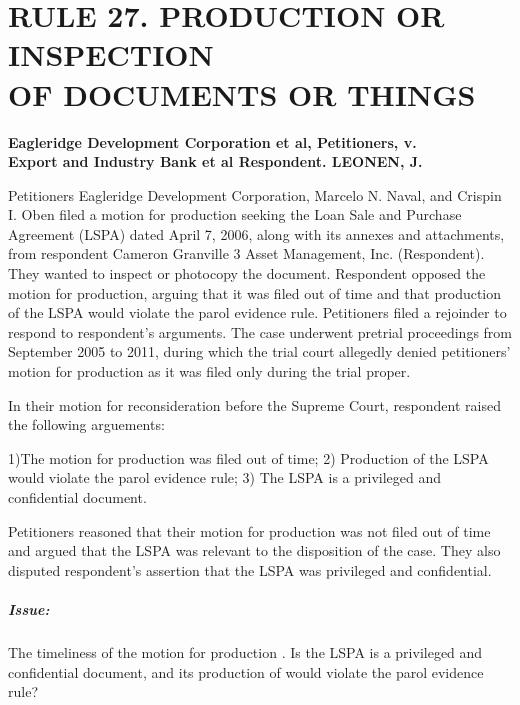 \documentclass[
12pt,
oneside,
onehalfspacing,
headsepline
]{DigestCollection}
\begin{document}
\chapter{RULE 27. PRODUCTION OR INSPECTION\\ OF DOCUMENTS OR THINGS}
\label{3e5096e0-0a13-11ef-932c-63c852f65e48}


\label{34346c20-0a10-11ef-932c-63c852f65e48}


\noindent\textbf{Eagleridge Development Corporation et al, Petitioners, v. \\Export and Industry Bank et al Respondent. LEONEN, J.}\vspace{0.4cm}

Petitioners Eagleridge Development Corporation, Marcelo N. Naval, and Crispin I. Oben filed a motion for production seeking the Loan Sale and Purchase Agreement (LSPA) dated April 7, 2006, along with its annexes and attachments, from respondent Cameron Granville 3 Asset Management, Inc. (Respondent). They wanted to inspect or photocopy the document. Respondent opposed the motion for production, arguing that it was filed out of time and that production of the LSPA would violate the parol evidence rule. Petitioners filed a rejoinder to respond to respondent's arguments. The case underwent pretrial proceedings from September 2005 to 2011, during which the trial court allegedly denied petitioners' motion for production as it was filed only during the trial proper.

In their motion for reconsideration before the Supreme Court, respondent raised the following arguements:

1)The motion for production was filed out of time; 2) Production of the LSPA would violate the parol evidence rule; 3) The LSPA is a privileged and confidential document.

Petitioners reasoned that their motion for production was not filed out of time and argued that the LSPA was relevant to the disposition of the case. They also disputed respondent's assertion that the LSPA was privileged and confidential.

\paragraph{Issue:}
\label{16b04a50-09fe-11ef-932c-63c852f65e48}


The timeliness of the motion for production . Is the LSPA is a privileged and confidential document, and its production of would violate the parol evidence rule?
\end{document}
